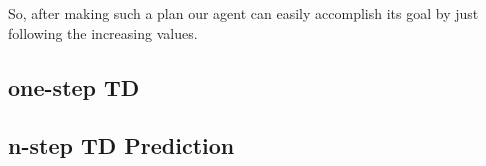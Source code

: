 So, after making such a plan our agent can easily accomplish its goal by just 
following the increasing values.


\subsection{one-step TD}



\subsection{n-step TD Prediction}



